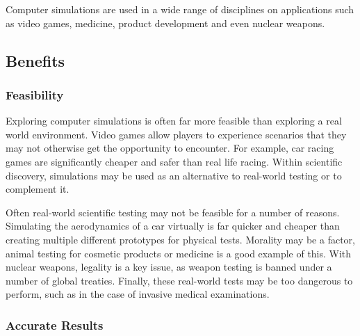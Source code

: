 \documentclass{UoYCSproject}
\begin{document}

Computer simulations are used in a wide range of disciplines on applications such as video games, medicine, product development and even nuclear weapons.

\subsection{Benefits}
\subsubsection{Feasibility}
Exploring computer simulations is often far more feasible than exploring a real world environment. Video games allow players to experience scenarios that they may not otherwise get the opportunity to encounter. For example, car racing games are significantly cheaper and safer than real life racing.
Within scientific discovery, simulations may be used as an alternative to real-world testing or to complement it.

Often real-world scientific testing may not be feasible for a number of reasons. Simulating the aerodynamics of a car virtually is far quicker and cheaper than creating multiple different prototypes for physical tests. Morality may be a factor, animal testing for cosmetic products or medicine is a good example of this. With nuclear weapons, legality is a key issue, as weapon testing is banned under a number of global treaties. Finally, these real-world tests may be too dangerous to perform, such as in the case of invasive medical examinations.



\subsubsection{Accurate Results}

\end{document}
